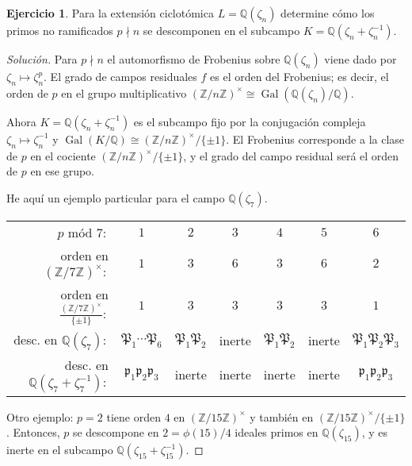 \documentclass{article}
\newcounter{tarea}
\theoremstyle{definition}
\newtheorem{ejercicio}{Ejercicio}[tarea]
\newenvironment{solucion}{\begin{proof}[Solución]}{\end{proof}}
\DeclareMathOperator{\Gal}{Gal}
\newcommand{\ZZ}{\mathbb{Z}}
\newcommand{\QQ}{\mathbb{Q}}
\begin{document}
\begin{ejercicio}
  Para la extensión ciclotómica $L = \QQ (\zeta_n)$ determine cómo los primos
  no ramificados $p\nmid n$ se descomponen en el subcampo
  $K = \QQ (\zeta_n + \zeta_n^{-1})$.

  \ifdefined\solutions
  \begin{solucion}
    Para $p\nmid n$ el automorfismo de Frobenius sobre $\QQ (\zeta_n)$ viene
    dado por $\zeta_n \mapsto \zeta_n^p$. El grado de campos residuales $f$ es
    el orden del Frobenius; es decir, el orden de $p$ en el grupo multiplicativo
    $(\ZZ/n\ZZ)^\times \cong \Gal (\QQ (\zeta_n)/\QQ)$.

    Ahora $K = \QQ (\zeta_n + \zeta_n^{-1})$ es el subcampo fijo por la
    conjugación compleja $\zeta_n \mapsto \zeta_n^{-1}$ y
    $\Gal (K/\QQ) \cong (\ZZ/n\ZZ)^\times / \{ \pm 1 \}$. El Frobenius
    corresponde a la clase de $p$ en el cociente
    $(\ZZ/n\ZZ)^\times / \{ \pm 1 \}$, y el grado del campo residual será el
    orden de $p$ en ese grupo.

    He aquí un ejemplo particular para el campo $\QQ (\zeta_7)$.

    \begin{center}\def\arraystretch{1.75}
      \begin{tabular}{rcccccc}
        \hline
        $p$ mód $7\colon$ & $1$ & $2$ & $3$ & $4$ & $5$ & $6$ \\
        orden en $(\ZZ/7\ZZ)^\times\colon$ & $1$ & $3$ & $6$ & $3$ & $6$ & $2$ \\
        orden en $\frac{(\ZZ/7\ZZ)^\times}{\{ \pm 1 \}}\colon$ & $1$ & $3$ & $3$ & $3$ & $3$ & $1$ \\
        desc. en $\QQ (\zeta_7)\colon$ & $\mathfrak{P}_1\cdots\mathfrak{P}_6$ & $\mathfrak{P}_1\mathfrak{P}_2$ & inerte & $\mathfrak{P}_1\mathfrak{P}_2$ & inerte & $\mathfrak{P}_1\mathfrak{P}_2\mathfrak{P}_3$ \\
        desc. en $\QQ (\zeta_7 + \zeta_7^{-1})\colon$ & $\mathfrak{p}_1\mathfrak{p}_2\mathfrak{p}_3$ & inerte & inerte & inerte & inerte & $\mathfrak{p}_1\mathfrak{p}_2\mathfrak{p}_3$ \\
        \hline
      \end{tabular}
    \end{center}

    Otro ejemplo: $p = 2$ tiene orden $4$ en $(\ZZ/15\ZZ)^\times$ y también en
    $(\ZZ/15\ZZ)^\times / \{ \pm 1 \}$. Entonces, $p$ se descompone en
    $2 = \phi (15)/4$ ideales primos en $\QQ (\zeta_{15})$, y es inerte en el
    subcampo $\QQ (\zeta_{15} + \zeta_{15}^{-1})$.
  \end{solucion}
  \fi
\end{ejercicio}
\end{document}
